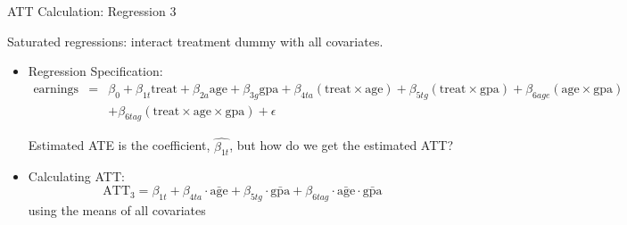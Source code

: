 \documentclass{beamer}
\begin{document}
\begin{frame}{ATT Calculation: Regression 3}
\tiny

Saturated regressions: interact treatment dummy with all covariates. 

\begin{itemize}
\item Regression Specification:
\begin{eqnarray*}
\text{earnings} &=& \beta_0 + \beta_{1t} \text{treat} + \beta_{2a} \text{age} + \beta_{3g} \text{gpa} + \beta_{4ta} (\text{treat} \times \text{age}) + \beta_{5tg} (\text{treat} \times \text{gpa}) + \beta_{6age} (\text{age} \times \text{gpa})  \nonumber \\
&&+ \beta_{6tag} (\text{treat} \times \text{age} \times \text{gpa}) + \epsilon
\end{eqnarray*}

\bigskip

Estimated ATE is the coefficient, $\widehat{\beta_{1t}}$, but how do we get the estimated ATT?

\item Calculating ATT:
\begin{equation*}
    \text{ATT}_3 = \beta_{1t} + \beta_{4ta} \cdot \bar{\text{age}} + \beta_{5tg} \cdot \bar{\text{gpa}} + \beta_{6tag} \cdot \bar{\text{age}} \cdot \bar{\text{gpa}}
\end{equation*}using the means of all covariates

\end{itemize}
\end{frame}
\end{document}
